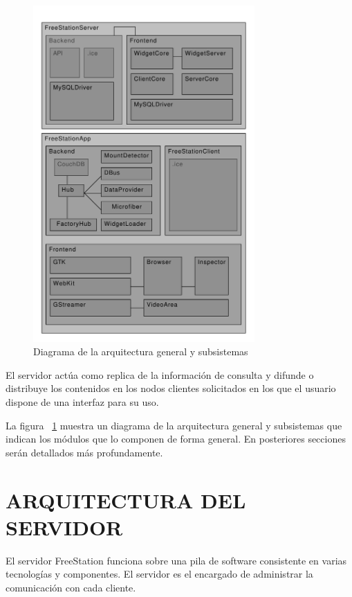 \begin{figure}[ht]
    \begin{center}
        \includegraphics[width=320px]{src/img/diagrams/freestation-full-architecture-diagram.pdf}
        \caption[Diagrama de la arquitectura general y subsistemas]
          {Diagrama de la arquitectura general y subsistemas}
          \label{fig:arqgeneral}
    \end{center}
\end{figure}

El servidor actúa como replica de la información de consulta y difunde o distribuye
los contenidos en los nodos clientes solicitados en los que el usuario dispone de una
interfaz para su uso.

La figura ~\ref{fig:arqgeneral} muestra un diagrama de la arquitectura
general y subsistemas que indican los módulos que lo componen de forma general.
En posteriores secciones serán detallados más profundamente.

\newpage

\section{\uppercase{Arquitectura del servidor}}

El servidor FreeStation funciona sobre una pila de software consistente en
varias tecnologías y componentes. El servidor es el encargado de
administrar la comunicación con cada cliente.

